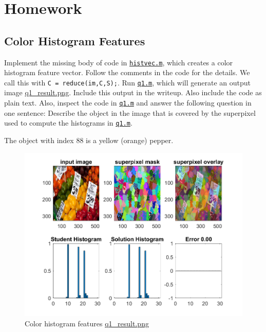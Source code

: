 \section{Homework \thesection}

\subsection{Color Histogram Features}
Implement the missing body of code in \href{./hw5/histvec.m}{\texttt{histvec.m}}, which creates a color histogram feature vector.
Follow the comments in the code for the details.
We call this with \texttt{C = reduce(im,C,S);}.
Run \href{./hw5/q1.m}{\texttt{q1.m}}, which will generate an output image \href{./hw5/q1_result.png}{q1\_result.png}.
Include this output in the writeup.
Also include the code as plain text.
Also, inspect the code in \href{./hw5/q1.m}{\texttt{q1.m}} and answer the following question in one sentence: Describe the object in the image that is covered by the superpixel used to compute the histograms in \href{./hw5/q1.m}{\texttt{q1.m}}.

The object with index 88 is a yellow (orange) pepper.
\begin{figure}[htbp]
	\centering
	\includegraphics[width=\textwidth]{hw5/q1_result.png}
    \caption{Color histogram features \href{./hw5/q1_result.png}{q1\_result.png}}
    \label{fig:17}
\end{figure}

